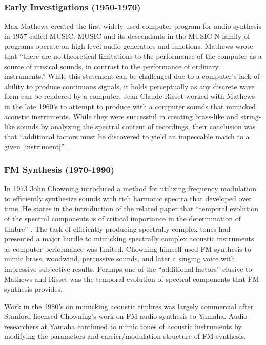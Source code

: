 \documentclass[12pt]{article}
\begin{document}
\subsubsection{Early Investigations (1950-1970)}
Max Mathews created the first widely used computer program for audio synthesis in 1957 called MUSIC. MUSIC and its descendants in the MUSIC-N family of programs operate on high level audio generators and functions. Mathews wrote that ``there are no theoretical limitations to the performance of the computer as a source of musical sounds, in contrast to the performance of ordinary instruments.'' \citep{mathews01111963} While this statement can be challenged due to a computer's lack of ability to produce continuous signals, it holds perceptually as any discrete wave form can be rendered by a computer. Jean-Claude Risset worked with Mathews in the late 1960's to attempt to produce with a computer sounds that mimicked acoustic instruments. While they were successful in creating brass-like and string-like sounds by analyzing the spectral content of recordings, their conclusion was that ``additional factors must be discovered to yield an impeccable match to a given [instrument]'' \citep{risset1969analysis}.

\subsubsection{FM Synthesis (1970-1990)}
In 1973 John Chowning introduced a method for utilizing frequency modulation to efficiently synthesize sounds with rich harmonic spectra that developed over time. He states in the introduction of the related paper that ``temporal evolution of the spectral components is of critical importance in the determination of timbre'' \citep{chowning1973synthesis}. The task of efficiently producing spectrally complex tones had presented a major hurdle to mimicking spectrally complex acoustic instruments as computer performance was limited. Chowning himself used FM synthesis to mimic brass, woodwind, percussive sounds, and later a singing voice \citep{chowning1989frequency} with impressive subjective results. Perhaps one of the ``additional factors'' elusive to Mathews and Risset was the temporal evolution of spectral components that FM synthesis provides.

Work in the 1980's on mimicking acoustic timbres was largely commercial after Stanford licensed Chowning's work on FM audio synthesis to Yamaha. Audio researchers at Yamaha continued to mimic tones of acoustic instruments by modifying the parameters and carrier/modulation structure of FM synthesis.
\end{document}
